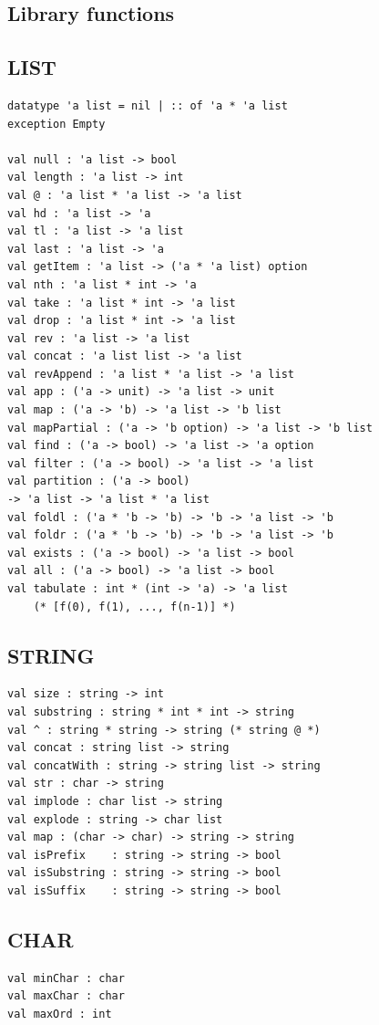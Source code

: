 \documentclass[10pt]{article}
\begin{document}
\begin{multicols}{2}

\section{Library functions}

\subsection{LIST}
\begin{verbatim}
datatype 'a list = nil | :: of 'a * 'a list
exception Empty

val null : 'a list -> bool
val length : 'a list -> int
val @ : 'a list * 'a list -> 'a list
val hd : 'a list -> 'a
val tl : 'a list -> 'a list
val last : 'a list -> 'a
val getItem : 'a list -> ('a * 'a list) option
val nth : 'a list * int -> 'a
val take : 'a list * int -> 'a list
val drop : 'a list * int -> 'a list
val rev : 'a list -> 'a list
val concat : 'a list list -> 'a list
val revAppend : 'a list * 'a list -> 'a list
val app : ('a -> unit) -> 'a list -> unit
val map : ('a -> 'b) -> 'a list -> 'b list
val mapPartial : ('a -> 'b option) -> 'a list -> 'b list
val find : ('a -> bool) -> 'a list -> 'a option
val filter : ('a -> bool) -> 'a list -> 'a list
val partition : ('a -> bool)
-> 'a list -> 'a list * 'a list
val foldl : ('a * 'b -> 'b) -> 'b -> 'a list -> 'b
val foldr : ('a * 'b -> 'b) -> 'b -> 'a list -> 'b
val exists : ('a -> bool) -> 'a list -> bool
val all : ('a -> bool) -> 'a list -> bool
val tabulate : int * (int -> 'a) -> 'a list
    (* [f(0), f(1), ..., f(n-1)] *)
\end{verbatim}

\subsection{STRING}
\begin{verbatim}
val size : string -> int
val substring : string * int * int -> string
val ^ : string * string -> string (* string @ *)
val concat : string list -> string
val concatWith : string -> string list -> string
val str : char -> string
val implode : char list -> string
val explode : string -> char list
val map : (char -> char) -> string -> string
val isPrefix    : string -> string -> bool
val isSubstring : string -> string -> bool
val isSuffix    : string -> string -> bool
\end{verbatim}

\subsection{CHAR}
\begin{verbatim}
val minChar : char
val maxChar : char
val maxOrd : int


\end{verbatim}
\end{multicols}
\end{document}
